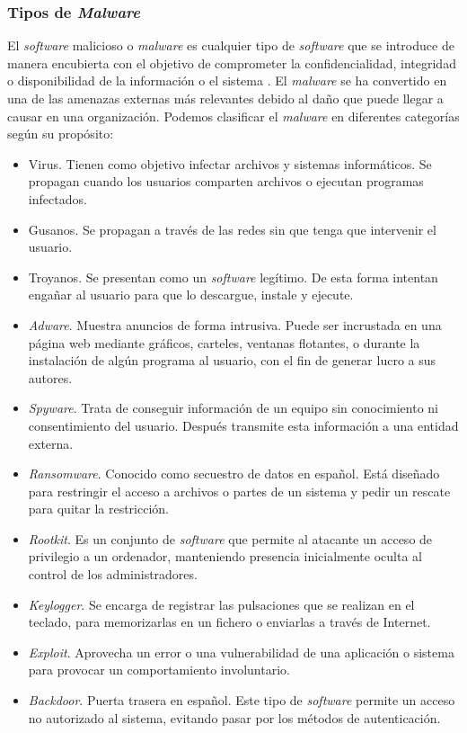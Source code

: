 \subsubsection{Tipos de \textit{Malware}}
\label{subsubsec:tipos_malware}
El \textit{software} malicioso o \textit{malware} es cualquier tipo de \textit{software} que se introduce de manera encubierta con el objetivo de comprometer la confidencialidad, integridad o disponibilidad de la información o el sistema \cite{def_malware}. El \textit{malware} se ha convertido en una de las amenazas externas más relevantes debido al daño que puede llegar a causar en una organización. Podemos clasificar el \textit{malware} en diferentes categorías \cite{categoriamw} según su propósito:

\begin{itemize}
	\item Virus. Tienen como objetivo infectar archivos y sistemas informáticos. Se propagan cuando los usuarios comparten archivos o ejecutan programas infectados.
	\item Gusanos. Se propagan a través de las redes sin que tenga que intervenir el usuario.
	\item Troyanos. Se presentan como un \textit{software} legítimo. De esta forma intentan engañar al usuario para que lo descargue, instale y ejecute.
	\item \textit{Adware}. Muestra anuncios de forma intrusiva. Puede ser incrustada en una página web mediante gráficos, carteles, ventanas flotantes, o durante la instalación de algún programa al usuario, con el fin de generar lucro a sus autores.
	\item \textit{Spyware}. Trata de conseguir información de un equipo sin conocimiento ni consentimiento del usuario. Después transmite esta información a una entidad externa.
	\item \textit{Ransomware}. Conocido como secuestro de datos en español. Está diseñado para restringir el acceso a archivos o partes de un sistema y pedir un rescate para quitar la restricción.
	\item \textit{Rootkit}. Es un conjunto de \textit{software} que permite al atacante un acceso de privilegio a un ordenador, manteniendo presencia inicialmente oculta al control de los administradores.
	\item \textit{Keylogger}. Se encarga de registrar las pulsaciones que se realizan en el teclado, para memorizarlas en un fichero o enviarlas a través de Internet.
	\item \textit{Exploit}. Aprovecha un error o una vulnerabilidad de una aplicación o sistema para provocar un comportamiento involuntario.
	\item \textit{Backdoor}. Puerta trasera en español. Este tipo de \textit{software} permite un acceso no autorizado al sistema, evitando pasar por los métodos de autenticación.
\end{itemize}

